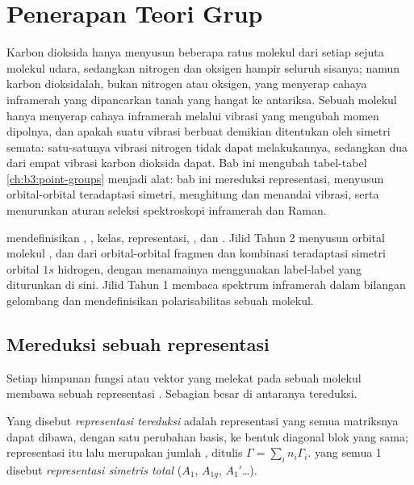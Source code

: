 \chapter{Penerapan Teori Grup}\label{ch:b3:group-theory-applied}

Karbon dioksida hanya menyusun beberapa ratus molekul dari setiap sejuta
molekul udara, sedangkan nitrogen dan oksigen hampir seluruh sisanya; namun
karbon dioksidalah, bukan nitrogen atau oksigen, yang menyerap cahaya
inframerah yang dipancarkan tanah yang hangat ke antariksa. Sebuah molekul
hanya menyerap cahaya inframerah melalui vibrasi yang mengubah momen
dipolnya, dan apakah suatu vibrasi berbuat demikian ditentukan oleh simetri
semata: satu-satunya vibrasi nitrogen tidak dapat melakukannya, sedangkan
dua dari empat vibrasi karbon dioksida dapat. Bab ini mengubah tabel-tabel
 \cref{ch:b3:point-groups} menjadi alat: bab ini mereduksi
representasi, menyusun orbital-orbital teradaptasi simetri, menghitung dan
menandai vibrasi, serta menurunkan aturan seleksi spektroskopi inframerah dan
Raman.

\begin{recall}
 mendefinisikan , , kelas,
representasi, , dan . Jilid Tahun 2 menyusun orbital
molekul ,  dan  dari orbital-orbital fragmen dan
kombinasi teradaptasi simetri orbital $1s$ hidrogen, dengan menamainya
menggunakan label-label yang diturunkan di sini. Jilid Tahun 1 membaca
spektrum inframerah dalam bilangan gelombang dan mendefinisikan
polarisabilitas sebuah molekul.
\end{recall}

\section{Mereduksi sebuah representasi}

Setiap himpunan fungsi atau vektor yang melekat pada sebuah molekul membawa
sebuah representasi . Sebagian besar di antaranya tereduksi.

\begin{definition}\label{def:b3:group-theory-applied:reducible}
Yang disebut \emph{representasi tereduksi}
adalah representasi yang semua matriksnya dapat dibawa, dengan satu
perubahan basis, ke bentuk diagonal blok yang sama; representasi itu lalu
merupakan jumlah , ditulis
$\Gamma = \sum_in_i\Gamma_i$.  yang semua
 1 disebut \emph{representasi simetris
total} ($A_1$, $A_{1g}$, $A_1'$\dots).
\end{definition}

